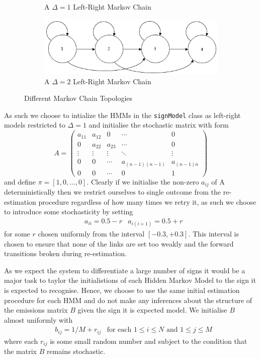 \begin{figure} [t]
\begin{subfigure}[b]{0.5\textwidth}
                \caption{A $\Delta = 1$ Left-Right Markov Chain}
                \label{fig:clust}
        \end{subfigure}
	   \begin{subfigure}[b]{0.5\textwidth}
                \centering
                \includegraphics[width=1.0\textwidth]{ThesisFigs/del2LRMC}
                \caption{A $\Delta = 2$ Left-Right Markov Chain}
                \label{fig:clust}
        \end{subfigure}
        \caption{Different Markov Chain Topologies}\label{fig:mctop}
\end{figure}

As such we choose to intialize the HMMs in the \verb|signModel| class as left-right models restricted to $\Delta = 1$ and initialise the stochastic matrix with form
\begin{equation*}
A =
 \begin{pmatrix}
  a_{11} & a_{12} & 0 & \cdots & 0 \\
  0 & a_{22} & a_{23} &\cdots & 0 \\
  \vdots  & \vdots  & \vdots & \ddots & \vdots  \\
  0 & 0 & \cdots & a_{(n-1)(n-1)}& a_{(n-1)n} \\
  0 & 0 & \cdots & 0& 1
 \end{pmatrix}
\end{equation*}
and define $\pi = [1,0, \dots, 0]$. Clearly if we initialise the non-zero $a_{ij}$ of A deterministically then we restrict ourselves to single outcome from the re-estimation procedure regardless of how many times we retry it, as such we choose to introduce some stochasticity by setting
\begin{align*}
&a_{ii} = 0.5 - r &a_{i(i+1)} = 0.5 + r
\end{align*}
 for some $r$ chosen uniformly from the interval $[-0.3, +0.3]$. This interval is chosen to ensure that none of the links are set too weakly and the forward transitions broken during re-estimation.

As we expect the system to differentiate a large number of signs it would be a major task to taylor the initialistions of each Hidden Markov Model to the sign it is expected to recognise. Hence, we choose to use the same initial estimation procedure for each HMM and do not make any inferences about the structure of the emissions matrix $B$ given the sign it is expected model. We initialise $B$ almost uniformly with
\begin{align*}
&b_{ij} = 1/M + r_{ij} &\text{for each $1\leq i \leq N$ and $1 \leq j \leq M$}
\end{align*}
where each $r_{ij}$ is some small random number and subject to the condition that the matrix $B$ remains stochastic.

